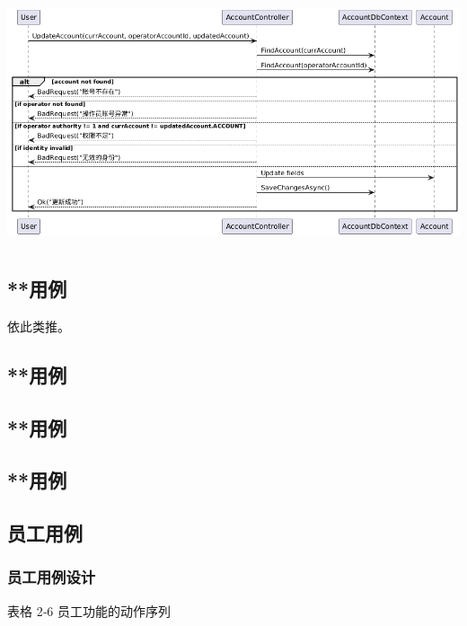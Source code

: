 \documentclass[]{article}
\begin{document}
\includegraphics[width=5.64167in,height=2.86458in]{media/media/image7.png}

\hypertarget{ux7528ux4f8b}{%
\subsection{**用例}\label{ux7528ux4f8b}}

依此类推。

\hypertarget{ux7528ux4f8b-1}{%
\subsection{**用例}\label{ux7528ux4f8b-1}}

\hypertarget{ux7528ux4f8b-2}{%
\subsection{**用例}\label{ux7528ux4f8b-2}}

\hypertarget{ux7528ux4f8b-3}{%
\subsection{**用例}\label{ux7528ux4f8b-3}}

\hypertarget{ux5458ux5de5ux7528ux4f8b}{%
\subsection{员工用例}\label{ux5458ux5de5ux7528ux4f8b}}

\hypertarget{ux5458ux5de5ux7528ux4f8bux8bbeux8ba1}{%
\subsubsection{员工用例设计}\label{ux5458ux5de5ux7528ux4f8bux8bbeux8ba1}}

表格 2‑6 员工功能的动作序列
\end{document}
